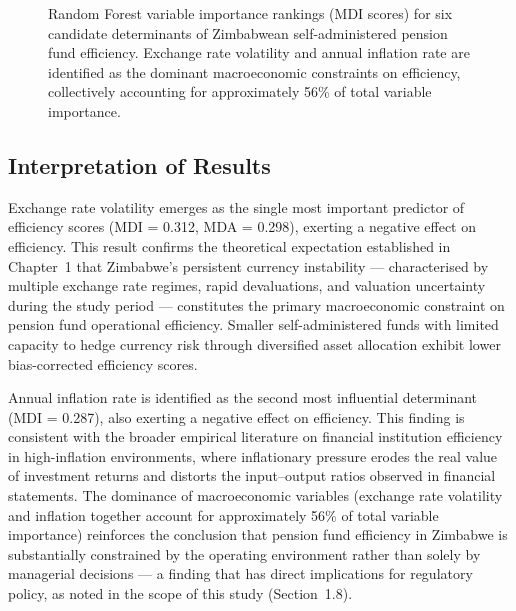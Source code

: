 \documentclass[12pt,a4paper]{article}
\begin{document}
\begin{figure}[H]
\centering
{}
\caption{Random Forest variable importance rankings (MDI scores) for six candidate determinants of Zimbabwean self-administered pension fund efficiency. Exchange rate volatility and annual inflation rate are identified as the dominant macroeconomic constraints on efficiency, collectively accounting for approximately 56\% of total variable importance.}
\label{fig:rf_importance}
\end{figure}

\subsection{Interpretation of Results}

Exchange rate volatility emerges as the single most important predictor of efficiency scores (MDI = 0.312, MDA = 0.298), exerting a negative effect on efficiency. This result confirms the theoretical expectation established in Chapter~1 that Zimbabwe's persistent currency instability --- characterised by multiple exchange rate regimes, rapid devaluations, and valuation uncertainty during the study period --- constitutes the primary macroeconomic constraint on pension fund operational efficiency. Smaller self-administered funds with limited capacity to hedge currency risk through diversified asset allocation exhibit lower bias-corrected efficiency scores.

Annual inflation rate is identified as the second most influential determinant (MDI = 0.287), also exerting a negative effect on efficiency. This finding is consistent with the broader empirical literature on financial institution efficiency in high-inflation environments, where inflationary pressure erodes the real value of investment returns and distorts the input--output ratios observed in financial statements. The dominance of macroeconomic variables (exchange rate volatility and inflation together account for approximately 56\% of total variable importance) reinforces the conclusion that pension fund efficiency in Zimbabwe is substantially constrained by the operating environment rather than solely by managerial decisions --- a finding that has direct implications for regulatory policy, as noted in the scope of this study (Section~1.8).
\end{document}
